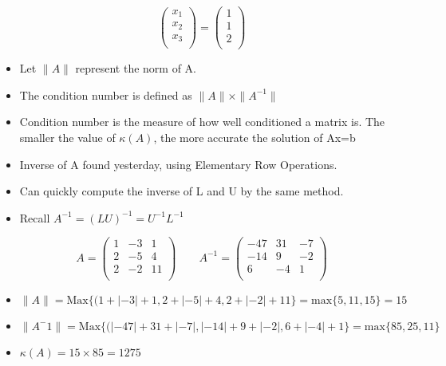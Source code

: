 \documentclass[12pt, a4paper]{report}
\theoremstyle{plain}
\theoremstyle{definition}
\theoremstyle{remark}
\begin{document}
{{\[
\left( \begin{array}{c}
x_1\\
x_2\\
x_3\\
\end{array}\right)
=\left( \begin{array}{c}
1\\
1\\
2\\
\end{array}\right)\]

}
\newpage
{\Large
\begin{itemize}
\item Let $\|A\|$ represent the norm of A.
\item The condition number is defined as $\|A\| \times \|A^{-1}\| $ 
\item Condition number is the measure of how well  conditioned a matrix is. The smaller the value of $\kappa(A)$, the more accurate the solution of Ax=b
\item Inverse of A found yesterday, using Elementary Row Operations.
\item Can quickly compute the inverse of L and U by the same method.
\item Recall $A^{-1} = (LU)^{-1} = U^{-1}L^{-1}$
\end{itemize}


\[A = \left(\begin{array}{ccc}
1&-3&1\\
2&-5&4\\
2&-2&11\\
\end{array}\right) \qquad A^{-1}=\left(\begin{array}{ccc}
-47	&	31	&	-7	\\
-14	&	9	&	-2	\\
6	&	-4	&	1	\\
\end{array}\right)\]

\begin{itemize}
\item $\|A\| = \mbox{Max} \{(1+|-3|+1, 2+|-5|+4, 2+|-2|+11  \} = \mbox{max} \{5,11,15 \}  = 15$
\item $\|A^-1\| = \mbox{Max} \{(|-47|+ 31 + |-7|, |-14|+ 9 +|-2|, 6+|-4|+1  \} = \mbox{max} \{85,25,11 \} $
\item $\kappa(A) = 15 \times 85 = 1275$
\end{itemize}
}
\newpage
{\large
}}
\end{document}
